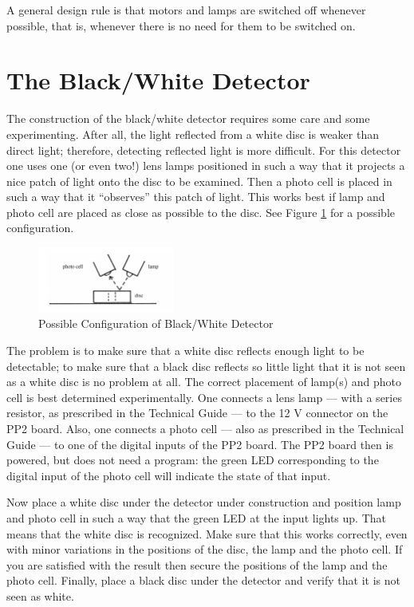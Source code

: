 \documentclass[a4paper,oneside,11pt]{report}
\begin{document}
A general design rule is that motors and lamps are switched off whenever possible, that is, whenever there is no need for them to be switched on.

\section{The Black/White Detector}
The construction of the black/white detector requires some care and some experimenting. After all, the light reflected from a white disc is weaker than direct light; therefore, detecting reflected light is more difficult. For this detector one uses one (or even two!) lens lamps positioned in such a way that it projects a nice patch of light onto the disc to be examined. Then a photo cell is placed in such a way that it “observes” this patch of light. This works best if lamp and photo cell are placed as close as possible to the disc. See Figure \ref{fig:examplebwdet} for a possible configuration.
\begin{figure}[H]
\centering
\includegraphics[width=0.4\textwidth]{images/examplebwdet.jpg}
\caption{Possible Configuration of Black/White Detector}
\label{fig:examplebwdet}
\end{figure}

The problem is to make sure that a white disc reflects enough light to be detectable; to make sure that a black disc reflects so little light that it is not seen as a white disc is no problem at all. The correct placement of lamp(s) and photo cell is best determined experimentally. One connects a lens lamp --- with a series resistor, as prescribed in the Technical Guide --- to the 12 V connector on the PP2 board. Also, one connects a photo cell --- also as prescribed in the Technical Guide --- to one of the digital inputs of the PP2 board. The PP2 board then is powered, but does not need a program: the green LED corresponding to the digital input of the photo cell will indicate the state of that input.

Now place a white disc under the detector under construction and position lamp and photo cell in such a way that the green LED at the input lights up. That means that the white disc is recognized. Make sure that this works correctly, even with minor variations in the positions of the disc, the lamp and the photo cell. If you are satisfied with the result then secure the positions of the lamp and the photo cell. Finally, place a black disc under the detector and verify that it is not seen as white.
\end{document}

